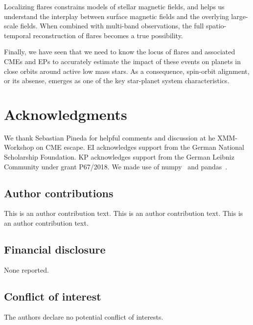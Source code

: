 \documentclass[proof]{WileyASNA-v1}
\begin{document}
Localizing flares constrains models of stellar magnetic fields, and helps us understand the interplay between surface magnetic fields and the overlying large-scale fields. When combined with multi-band observations, the full spatio-temporal reconstruction of flares becomes a true possibility.

Finally, we have seen that we need to know the locus of flares and associated CMEs and EPs to accurately estimate the impact of these events on planets in close orbits around active low mass stars. As a consequence, spin-orbit alignment, or its absense, emerges as one of the key star-planet system characteristics.


\section*{Acknowledgments}
We thank  Sebastian Pineda for helpful comments and discussion at he XMM-Workshop on CME escape.
EI acknowledges support from the German National Scholarship Foundation. KP acknowledges support from the German Leibniz Community under grant P67/2018. We made use of numpy~\citep{numpy2020} and pandas~\citep{pandas2010,pandas2020software}.


\subsection*{Author contributions}

This is an author contribution text. This is an author contribution text. This is an author contribution text.  

\subsection*{Financial disclosure}

None reported.

\subsection*{Conflict of interest}

The authors declare no potential conflict of interests.


\end{document}
